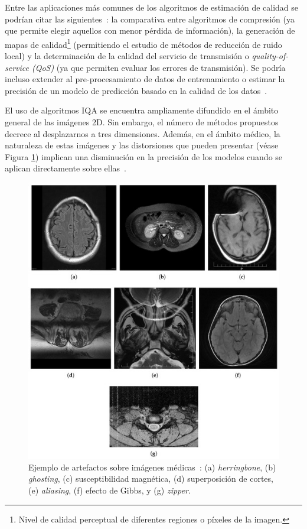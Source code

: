Entre las aplicaciones más comunes de los algoritmos de estimación de calidad se podrían citar las siguientes~\cite{VMAF, VMAFReproducibility, Applications}:  
la comparativa entre algoritmos de compresión (ya que permite elegir aquellos con 
menor pérdida de información), la generación de mapas de calidad\footnote{
  Nivel de calidad perceptual de diferentes regiones o píxeles de la imagen.
}
(permitiendo el estudio de métodos de reducción de ruido local)
y la determinación de la calidad del servicio de transmisión o \emph{quality-of-service (QoS)}
(ya que permiten evaluar los errores de transmisión). Se podría incluso 
extender al pre-procesamiento de datos de entrenamiento o estimar la precisión 
de un modelo de predicción basado en la calidad de los datos~\cite{ApplicationsOfIQA}.

El uso de algoritmos IQA se encuentra ampliamente difundido en el ámbito general de las imágenes 2D. 
Sin embargo, el número de métodos propuestos decrece al desplazarnos a tres dimensiones.
Además, en el ámbito médico, la naturaleza de estas imágenes y las distorsiones que pueden 
presentar (véase Figura \ref{fig:DicomDistortionsExample}) implican una disminución en 
la precisión de los modelos cuando se aplican directamente sobre ellas~\cite{VisualMedicalQualityBook}.

\begin{figure}[htp]
  \centering 
  \includegraphics[width=.7\textwidth]{imagenes/chapter2/MedicalDistortions}
  \caption[Ejemplo de artefactos sobre imágenes DICOM.]{Ejemplo de artefactos sobre imágenes médicas~\cite{MoreMedicalDistortion}: 
     (a) \emph{herringbone}, (b) \emph{ghosting}, (c) susceptibilidad magnética, (d) superposición de cortes, (e) \emph{aliasing}, (f) efecto de Gibbs, y (g) \emph{zipper}.
   }
  \label{fig:DicomDistortionsExample}
\end{figure}

